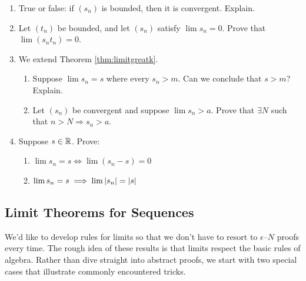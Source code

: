 \begin{exercises}{}{}
\begin{enumerate}
	 	
	 	\item True or false: if $(s_n)$ is bounded, then it is convergent. Explain.
	 	

	  \item\label{exs:tbddproduct}%
	  Let $(t_n)$ be bounded, and let $(s_n)$ satisfy $\lim s_n=0$. Prove that $\lim(s_nt_n)=0$.%
		
	
	  \item\label{exs:convlowerbound}%
	  We extend Theorem \ref{thm:limitgreatk}.
	  \begin{enumerate}
	    \item Suppose $\lim s_n=s$ where every $s_n>m$. Can we conclude that $s>m$? Explain.
	    \item%
	  	Let $(s_n)$ be convergent and suppose $\lim s_n>a$. Prove that $\exists N$ such that $n>N\Longrightarrow s_n>a$.
		\end{enumerate}
		
		
		\item Suppose $s\in\mathbb{R}$. Prove:
		\begin{enumerate}
		  \item $\lim s_n=s\iff \lim(s_n-s)=0$
			\item $\lim s_n=s\implies \lim\left| s_n\right|=\left| s\right|$
		\end{enumerate}
		
	\end{enumerate}
\end{exercises}


\clearpage


\subsection{Limit Theorems for Sequences}\label{sec:limitthms}

We'd like to develop rules for limits so that we don't have to resort to $\epsilon$--$N$ proofs every time. The rough idea of these results is that limits respect the basic rules of algebra. Rather than dive straight into abstract proofs, we start with two special cases that illustrate commonly encountered tricks.

